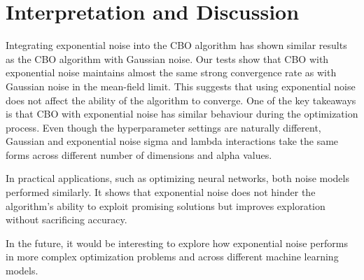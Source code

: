 \documentclass[a4paper, 11pt]{article}
\begin{document}
\section{Interpretation and Discussion}
Integrating exponential noise into the CBO algorithm has shown similar results as the CBO algorithm with Gaussian noise. Our tests show that CBO with exponential noise maintains almost the same strong convergence rate as with Gaussian noise in the mean-field limit. This suggests that using exponential noise does not affect the ability of the algorithm to converge. 
One of the key takeaways is that CBO with exponential noise has similar behaviour during the optimization process. Even though the hyperparameter settings are naturally different, Gaussian and exponential noise sigma and lambda interactions take the same forms across different number of dimensions and alpha values.

In practical applications, such as optimizing neural networks, both noise models performed similarly. It shows that exponential noise does not hinder the algorithm’s ability to exploit promising solutions but improves exploration without sacrificing accuracy.

In the future, it would be interesting to explore how exponential noise performs in more complex optimization problems and across different machine learning models.

\clearpage




\clearpage
\end{document}
